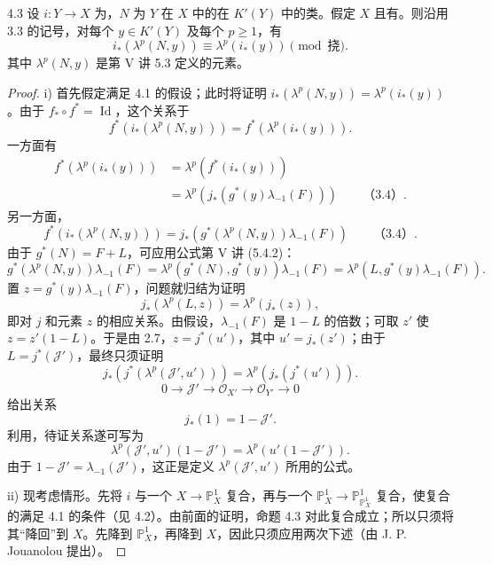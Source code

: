 \begin{SGAresult}{}{4.3}
设 $i:Y\to X$ 为，$N$ 为 $Y$ 在 $X$ 中的在 $K'(Y)$ 中的类。假定 $X$ 且有。则沿用 3.3 的记号，对每个 $y\in K'(Y)$ 及每个 $p\geq1$，有
\[
i_*(\lambda^p(N,y))\equiv\lambda^p(i_*(y))\pmod{\text{挠}}.\tag{4.3.1}
\]
其中 $\lambda^p(N,y)$ 是第 V 讲 5.3 定义的元素。
\end{SGAresult}
\begin{proof}
i) 首先假定满足 4.1 的假设；此时将证明 $i_*(\lambda^p(N,y))=\lambda^p(i_*(y))$。由于 $f_*\circ f^*=\operatorname{Id}$，这个关系于
\[
f^*(i_*(\lambda^p(N,y)))=f^*(\lambda^p(i_*(y))).
\]
一方面有
\[
\begin{aligned}
f^*(\lambda^p(i_*(y)))&=\lambda^p(f^*(i_*(y)))\\
&=\lambda^p(j_*(g^*(y)\lambda_{-1}(F)))\qquad\text{（3.4）}.
\end{aligned}
\]
另一方面，
\[
f^*(i_*(\lambda^p(N,y)))=j_*(g^*(\lambda^p(N,y))\lambda_{-1}(F))\qquad\text{（3.4）}.
\]
由于 $g^*(N)=F+L$，可应用公式第 V 讲 (5.4.2)：
\[
g^*(\lambda^p(N,y))\lambda_{-1}(F)
=\lambda^p(g^*(N),g^*(y))\lambda_{-1}(F)
=\lambda^p(L,g^*(y)\lambda_{-1}(F)).
\]
置 $z=g^*(y)\lambda_{-1}(F)$，问题就归结为证明
\[
j_*(\lambda^p(L,z))=\lambda^p(j_*(z)),
\]
即对 $j$ 和元素 $z$ 的相应关系。由假设，$\lambda_{-1}(F)$ 是 $1-L$ 的倍数；可取 $z'$ 使 $z=z'(1-L)$。于是由 2.7，$z=j^*(u')$，其中 $u'=j_*(z')$；由于 $L=j^*(\mathcal J')$，最终只须证明
\[
j_*(j^*(\lambda^p(\mathcal J',u')))=\lambda^p(j_*(j^*(u'))).
\]
\[
0\longrightarrow\mathcal J'\longrightarrow\mathcal O_{X'}\longrightarrow\mathcal O_{Y'}\longrightarrow0
\]
给出关系
\[
j_*(1)=1-\mathcal J'.\tag{4.3.2}
\]
利用，待证关系遂可写为
\[
\lambda^p(\mathcal J',u')(1-\mathcal J')=\lambda^p(u'(1-\mathcal J')).
\]
由于 $1-\mathcal J'=\lambda_{-1}(\mathcal J')$，这正是定义 $\lambda^p(\mathcal J',u')$ 所用的公式。

ii) 现考虑情形。先将 $i$ 与一个 $X\to\mathbb P_X^1$ 复合，再与一个 $\mathbb P_X^1\to\mathbb P_{\mathbb P_X^1}^1$ 复合，使复合的满足 4.1 的条件（见 4.2）。由前面的证明，命题 4.3 对此复合成立；所以只须将其“降回”到 $X$。先降到 $\mathbb P_X^1$，再降到 $X$，因此只须应用两次下述（由 J. P. Jouanolou 提出）。


\end{proof}
